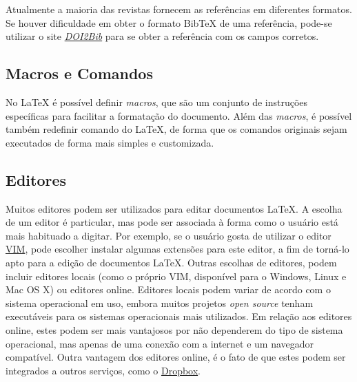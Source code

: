 Atualmente a maioria das revistas fornecem as referências em diferentes formatos. Se houver dificuldade em obter o formato Bib\TeX{} de uma referência, pode-se utilizar o site \href{https://doi2bib.org}{\textit{DOI2Bib}} para se obter a referência com os campos corretos.




\subsection{Macros e Comandos}
\label{sec:mac_cmd}

No \LaTeX{} é possível definir \textit{macros}, que são um conjunto de instruções específicas para facilitar a formatação do documento. Além das \textit{macros}, é possível também redefinir comando do \LaTeX{}, de forma que os comandos originais sejam executados de forma mais simples e customizada.


\subsection{Editores}
\label{sec:editores}

Muitos editores podem ser utilizados para editar documentos \LaTeX{}. A escolha de um editor é particular, mas pode ser associada à forma como o usuário está mais habituado a digitar. Por exemplo, se o usuário gosta de utilizar o editor \href{https://www.vim.org}{VIM}, pode escolher instalar algumas extensões para este editor, a fim de torná-lo apto para a edição de documentos \LaTeX{}. Outras escolhas de editores, podem incluir editores locais (como o próprio VIM, disponível para o Windows, Linux e Mac OS X) ou editores online. Editores locais podem variar de acordo com o sistema operacional em uso, embora muitos projetos \textit{open source} tenham executáveis para os sistemas operacionais mais utilizados. Em relação aos editores online, estes podem ser mais vantajosos por não dependerem do tipo de sistema operacional, mas apenas de uma conexão com a internet e um navegador compatível. Outra vantagem dos editores online, é o fato de que estes podem ser integrados a outros serviços, como o \href{https://dropbox.com}{Dropbox}.

